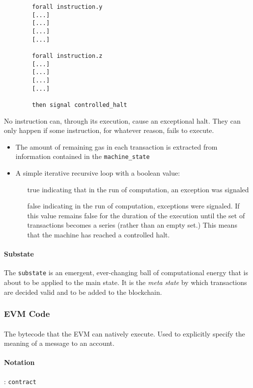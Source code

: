 \documentclass[10pt,a4paper,leqno,bibliography=totoc]{scrartcl}
\newenvironment{alphafootnotes}
{\par\edef\savedfootnotenumber{\number\value{footnote}}
\renewcommand{\thefootnote}{\alph{footnote}}
\setcounter{footnote}{0}}
{\par\setcounter{footnote}{\savedfootnotenumber}}
\begin{document}
\begin{alphafootnotes}
\begin{multicols*}{2}
\begin{verbatim}
		forall instruction.y 
		[...]
		[...]
		[...]
		[...]
		
		forall instruction.z 
		[...]
		[...]
		[...]
		[...]
		
		then signal controlled_halt
		\end{verbatim}
		
		No instruction can, through its execution, cause an exceptional halt. They can only happen if some instruction, for whatever reason, fails to execute.
		
		\begin{itemize}
			\item The amount of remaining gas in each transaction is extracted from information contained in the \texttt{machine\_state} 
			\item A simple iterative recursive  loop\supercite{Wood2017} with a boolean  value: 
			\begin{itemize}
				\item[true] indicating that in the run of computation, an exception was signaled
				\item[false] indicating in the run of computation, exceptions were signaled. If this value remains false for the duration of the execution until the set of transactions becomes a series (rather than an empty set.) This means that the machine has reached a controlled halt. 
			\end{itemize}
		\end{itemize}
    	
				\paragraph{Substate}
					The \texttt{substate} is an emergent, ever-changing ball of computational energy that is about to be applied to the main state. It is the \textit{meta state} by which transactions are decided valid and to be added to the blockchain.
		
			\subsubsection{EVM Code}
				\paragraph{}The bytecode that the EVM can natively execute. Used to explicitly specify the meaning of a message to an account.
				\paragraph{Notation}: \texttt{contract}

\end{multicols*}
\end{alphafootnotes}
\end{document}
